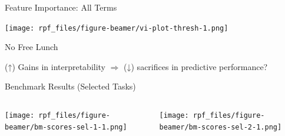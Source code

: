 \documentclass[aspectratio=169,12pt]{beamer}
\providecommand{\tightlist}{%
  \setlength{\itemsep}{2pt}\setlength{\parskip}{0pt}}
\begin{document}
\begin{frame}{Feature Importance: All Terms}
\label{feature-importance-all-terms}
\begin{center}
\texttt{[image: rpf\_files/figure-beamer/vi-plot-thresh-1.png]}
\end{center}
\end{frame}

\begin{frame}{No Free Lunch}
\label{no-free-lunch}
\begin{center}
(↑) Gains in interpretability \(\Rightarrow\) (↓) sacrifices in
predictive performance?

\end{center}

\vfill

\pause

\end{frame}

\begin{frame}{Benchmark Results (Selected Tasks)}
\label{benchmark-results-selected-tasks}
\begin{columns}[T]
\begin{column}{0.5\linewidth}
\begin{center}
\texttt{[image: rpf\_files/figure-beamer/bm-scores-sel-1-1.png]}
\end{center}
\end{column}

\pause

\begin{column}{0.5\linewidth}
\begin{center}
\texttt{[image: rpf\_files/figure-beamer/bm-scores-sel-2-1.png]}
\end{center}
\end{column}
\end{columns}
\end{frame}
\end{document}
